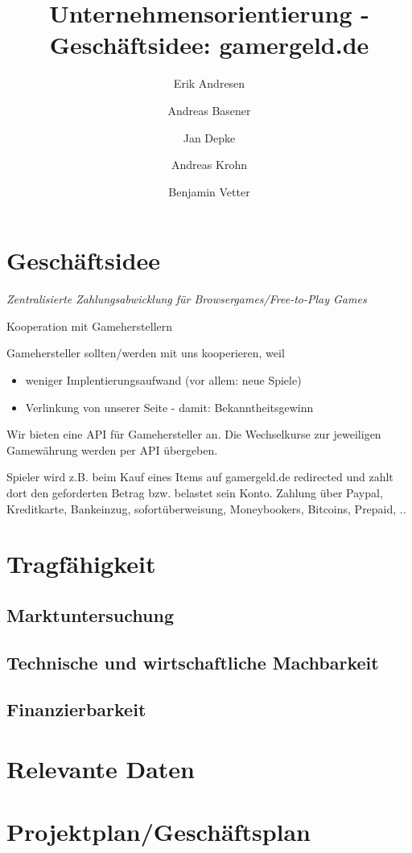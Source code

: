 \documentclass[a4paper,10pt]{article}
\title{Unternehmensorientierung - Geschäftsidee: gamergeld.de}
\author{Erik Andresen \and Andreas Basener \and Jan Depke \and Andreas Krohn \and Benjamin Vetter}
\begin{document}
\maketitle

\section{Geschäftsidee}
\emph{Zentralisierte Zahlungsabwicklung für Browsergames/Free-to-Play Games}

Kooperation mit Gameherstellern

Gamehersteller sollten/werden mit uns kooperieren, weil
\begin{itemize}
  \item weniger Implentierungsaufwand (vor allem: neue Spiele)
  \item Verlinkung von unserer Seite - damit: Bekanntheitsgewinn
\end{itemize}

Wir bieten eine API für Gamehersteller an.
Die Wechselkurse zur jeweiligen Gamewährung werden per API übergeben.

Spieler wird z.B. beim Kauf eines Items auf gamergeld.de redirected und zahlt dort den geforderten Betrag bzw. belastet sein Konto.
Zahlung über Paypal, Kreditkarte, Bankeinzug, sofortüberweisung, Moneybookers, Bitcoins, Prepaid, ..


\section{Tragfähigkeit}
\subsection{Marktuntersuchung}
\subsection{Technische und wirtschaftliche Machbarkeit}
\subsection{Finanzierbarkeit}


\section{Relevante Daten}

\section{Projektplan/Geschäftsplan}
\end{document}
